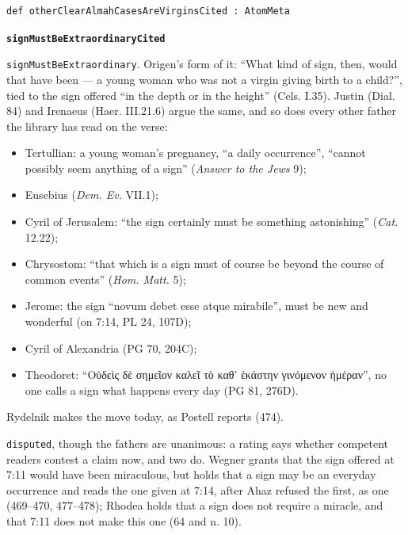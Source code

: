 \documentclass[11pt]{article}
\begin{document}
{\small\begin{verbatim}
def otherClearAlmahCasesAreVirginsCited : AtomMeta
\end{verbatim}}
\par\medskip\noindent\textbf{\texttt{sign\allowbreak{}Must\allowbreak{}Be\allowbreak{}Extraordinary\allowbreak{}Cited}}\par\nobreak\noindent
\texttt{sign\allowbreak{}Must\allowbreak{}Be\allowbreak{}Extraordinary}. Origen’s form of it: “What kind of sign, then, would that have been — a young woman who was not a virgin giving birth to a child?”, tied to the sign offered “in the depth or in the height” (Cels. I.35). Justin (Dial. 84) and Irenaeus (Haer. III.21.6) argue the same, and so does every other father the library has read on the verse:

\begin{itemize}
  \item Tertullian: a young woman’s pregnancy, “a daily occurrence”, “cannot possibly seem anything of a sign” (\emph{Answer to the Jews} 9);
  \item Eusebius (\emph{Dem. Ev.} VII.1);
  \item Cyril of Jerusalem: “the sign certainly must be something astonishing” (\emph{Cat.} 12.22);
  \item Chrysostom: “that which is a sign must of course be beyond the course of common events” (\emph{Hom. Matt.} 5);
  \item Jerome: the sign “novum debet esse atque mirabile”, must be new and wonderful (on 7:14, PL 24, 107D);
  \item Cyril of Alexandria (PG 70, 204C);
  \item Theodoret: “Οὐδεὶς δὲ σημεῖον καλεῖ τὸ καθ’ ἑκάστην γινόμενον ἡμέραν”, no one calls a sign what happens every day (PG 81, 276D).
\end{itemize}
Rydelnik makes the move today, as Postell reports (474).

\texttt{disputed}, though the fathers are unanimous: a rating says whether competent readers contest a claim now, and two do. Wegner grants that the sign offered at 7:11 would have been miraculous, but holds that a sign may be an everyday occurrence and reads the one given at 7:14, after Ahaz refused the first, as one (469–470, 477–478); Rhodea holds that a sign does not require a miracle, and that 7:11 does not make this one (64 and n. 10).
\end{document}
